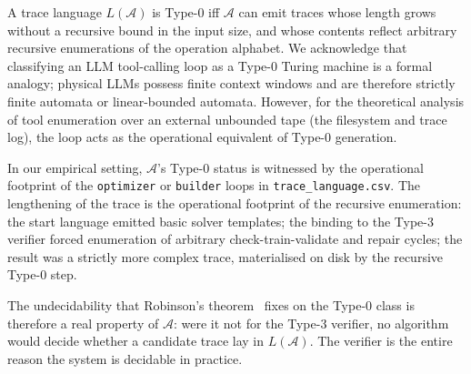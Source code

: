 A trace language $L(\mathcal{A})$ is Type-0 iff $\mathcal{A}$ can
emit traces whose length grows without a recursive bound in the
input size, and whose contents reflect arbitrary recursive
enumerations of the operation alphabet.  We acknowledge that
classifying an LLM tool-calling loop as a Type-0 Turing machine
is a formal analogy; physical LLMs possess finite context windows
and are therefore strictly finite automata or linear-bounded
automata. However, for the theoretical analysis of tool enumeration
over an external unbounded tape (the filesystem and trace log), the
loop acts as the operational equivalent of Type-0 generation.

In our empirical setting, $\mathcal{A}$'s Type-0 status is witnessed
by the operational footprint of the \texttt{optimizer} or
\texttt{builder} loops in \texttt{trace\_language.csv}. The
lengthening of the trace is the operational footprint of the
recursive enumeration: the start language emitted basic solver
templates; the binding to the Type-3 verifier forced enumeration
of arbitrary check-train-validate and repair cycles; the result
was a strictly more complex trace, materialised on disk by the
recursive Type-0 step.

The undecidability that Robinson's
theorem~\cite{robinson1949definability,davis1961decision} fixes
on the Type-0 class is therefore a real property of $\mathcal{A}$:
were it not for the Type-3 verifier, no algorithm would decide
whether a candidate trace lay in $L(\mathcal{A})$.  The verifier
is the entire reason the system is decidable in practice.
